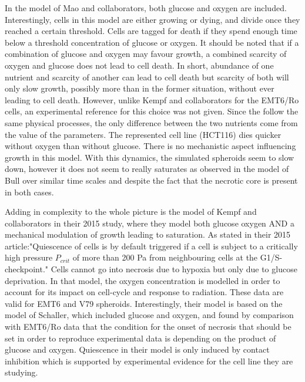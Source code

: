 \documentclass[11pt,a4paper]{article}
\begin{document}
In the model of Mao and collaborators, both glucose and oxygen are included.\cite{Mao2018} Interestingly, cells in this model are either growing or dying, and divide once they reached a certain threshold. Cells are tagged for death if they spend enough time below a threshold concentration of glucose or oxygen.  It should be noted that if a combination of glucose and oxygen may favour growth, a combined scarcity of oxygen and glucose does not lead to cell death. In short, abundance of one nutrient and scarcity of another can lead to cell death but scarcity of both will only slow growth, possibly more than in the former situation, without ever leading to cell death. However, unlike Kempf and collaborators for the EMT6/Ro cells, an experimental reference for this choice was not given. Since the follow the same physical processes, the only difference between the two nutrients come from the value of the parameters. The represented cell line (HCT116) dies quicker without oxygen than without glucose. There is no mechanistic aspect influencing growth in this model. With this dynamics, the simulated spheroids seem to slow down, however it does not seem to really saturates as observed in the model of Bull over similar time scales and despite the fact that the necrotic core is present in both cases.

Adding in complexity to the whole picture is the model of Kempf and collaborators in their 2015 study, where they model both glucose oxygen AND a mechanical modulation of growth leading to saturation. As stated in their 2015 article:"Quiescence of cells is by default triggered if a cell is subject to a critically high
pressure $P_{crit}$ of more than 200 Pa from neighbouring cells at the G1/S-checkpoint." Cells cannot go into necrosis due to hypoxia but only due to glucose deprivation. In that model, the oxygen concentration is modelled in order to account for its impact on cell-cycle and response to radiation. These data are valid for EMT6 and V79 spheroids. Interestingly, their model is based on the model of Schaller,\cite{Kempf2005} which included glucose and oxygen, and found by comparison with EMT6/Ro data that the condition for the onset of necrosis that should be set in order to reproduce experimental data is depending on the product of glucose and oxygen. Quiescence in their model is only induced by contact inhibition which is supported by experimental evidence for the cell line they are studying.
\end{document}
